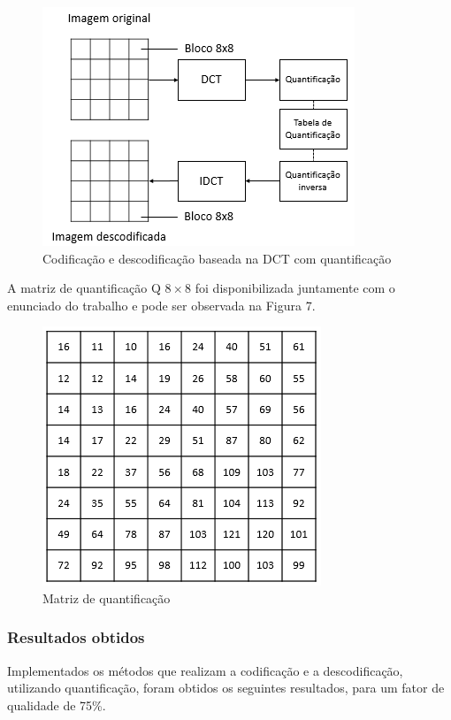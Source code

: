 \documentclass[12pt,a4paper]{article}
\begin{document}
\begin{figure}[h]
\centering
\includegraphics[width=.6\linewidth]{imagens/quant3.png}
\caption{Codificação e descodificação baseada na DCT com quantificação}
\end{figure}

A matriz de quantificação Q $8\times 8$ foi disponibilizada juntamente com o enunciado do trabalho e pode ser observada na Figura 7.

\begin{figure}[h]
	\centering
	\includegraphics[width=.4\linewidth]{imagens/quantificacao.png}
	\caption{Matriz de quantificação}
\end{figure}

\newpage

\subsubsection{Resultados obtidos}
Implementados os métodos que realizam a codificação e a descodificação, utilizando quantificação, foram obtidos os seguintes resultados, para um fator de qualidade de 75\%.
\end{document}
